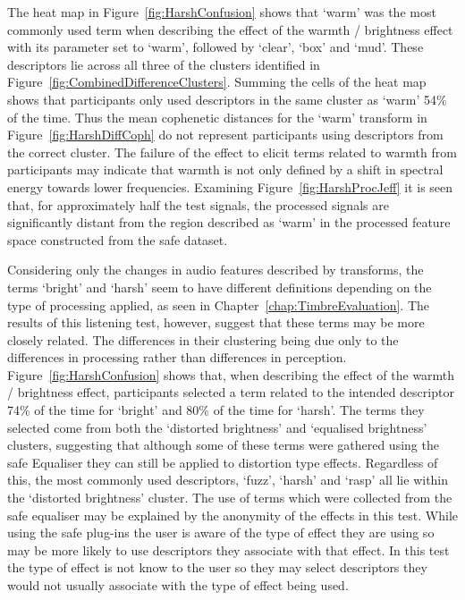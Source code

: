 			The heat map in Figure~\ref{fig:HarshConfusion} shows that `warm' was the most commonly used term
			when describing the effect of the warmth / brightness effect with its parameter set to `warm',
			followed by `clear', `box' and `mud'. These descriptors lie across all three of the clusters
			identified in Figure~\ref{fig:CombinedDifferenceClusters}. Summing the cells of the heat map shows
			that participants only used descriptors in the same cluster as `warm' 54\% of the time. Thus the
			mean cophenetic distances for the `warm' transform in Figure~\ref{fig:HarshDiffCoph} do not
			represent participants using descriptors from the correct cluster. The failure of the effect to
			elicit terms related to warmth from participants may indicate that warmth is not only defined by a
			shift in spectral energy towards lower frequencies. Examining Figure~\ref{fig:HarshProcJeff} it is
			seen that, for approximately half the test signals, the processed signals are significantly distant
			from the region described as `warm' in the processed feature space constructed from the
			\acrshort{safe} dataset.
			
			Considering only the changes in audio features described by transforms, the terms `bright' and
			`harsh' seem to have different definitions depending on the type of processing applied, as seen in
			Chapter~\ref{chap:TimbreEvaluation}. The results of this listening test, however, suggest that
			these terms may be more closely related. The differences in their clustering being due only to the
			differences in processing rather than differences in perception. Figure~\ref{fig:HarshConfusion}
			shows that, when describing the effect of the warmth / brightness effect, participants selected a
			term related to the intended descriptor 74\% of the time for `bright' and 80\% of the time for
			`harsh'. The terms they selected come from both the `distorted brightness' and `equalised
			brightness' clusters, suggesting that although some of these terms were gathered using the
			\acrshort{safe} Equaliser they can still be applied to distortion type effects. Regardless of this,
			the most commonly used descriptors, `fuzz', `harsh' and `rasp' all lie within the `distorted
			brightness' cluster. The use of terms which were collected from the \acrshort{safe} equaliser may
			be explained by the anonymity of the effects in this test. While using the \acrshort{safe} plug-ins
			the user is aware of the type of effect they are using so may be more likely to use descriptors
			they associate with that effect.  In this test the type of effect is not know to the user so they
			may select descriptors they would not usually associate with the type of effect being used.


